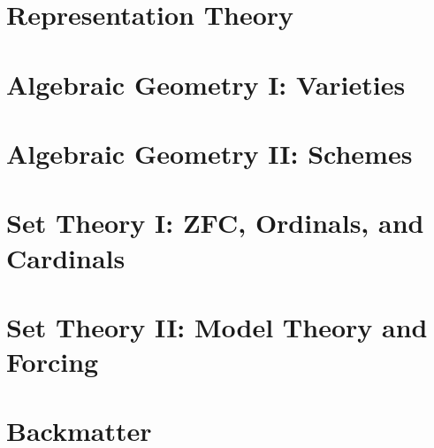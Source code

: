 \documentclass[11pt,twoside=semi,openright,numbers=noenddot]{scrreprt}
\begin{document}
\part{Representation Theory}





\part{Algebraic Geometry I: Varieties}





\part{Algebraic Geometry II: Schemes}






\part{Set Theory I: ZFC, Ordinals, and Cardinals}





\part{Set Theory II: Model Theory and Forcing}




\part{Backmatter}
\appendix
{} %







\clearpage
\printbibliography[type=image,title={Image Attributions}]
\printbibliography[nottype=image]
\end{document}
